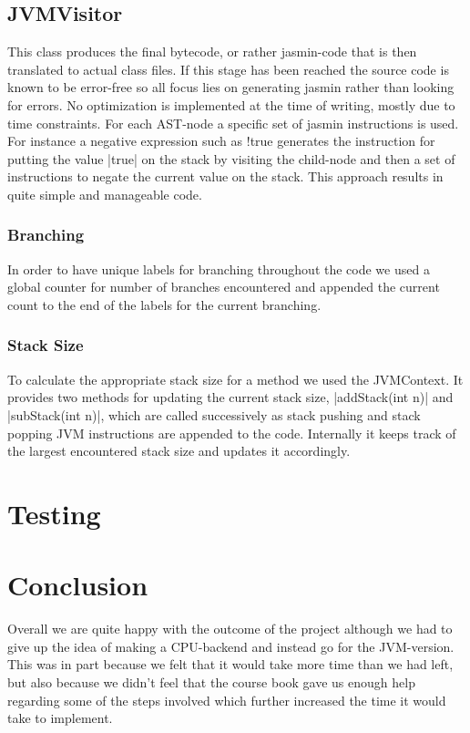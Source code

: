 \documentclass[paper=a4, fontsize=11pt]{scrartcl} %
\numberwithin{equation}{section} %
\numberwithin{figure}{section} %
\numberwithin{table}{section} %
\begin{document}
\subsection{JVMVisitor}

This class produces the final bytecode, or rather jasmin-code that is then translated to actual class files.
If this stage has been reached the source code is known to be error-free so all focus lies on generating jasmin rather than looking for errors.
No optimization is implemented at the time of writing, mostly due to time constraints.
For each AST-node a specific set of jasmin instructions is used.
For instance a negative expression such as !true generates the instruction for putting the value |true| on the stack by visiting the child-node and then a set of instructions to negate the current value on the stack.
This approach results in quite simple and manageable code.

\subsubsection*{Branching}

In order to have unique labels for branching throughout the code we used a global counter for number of branches encountered and appended the current count to the end of the labels for the current branching.

\subsubsection*{Stack Size}

To calculate the appropriate stack size for a method we used the JVMContext.
It provides two methods for updating the current stack size, |addStack(int n)| and |subStack(int n)|, which are called successively as stack pushing and stack popping JVM instructions are appended to the code.
Internally it keeps track of the largest encountered stack size and updates it accordingly.\\

\section{Testing}

\section{Conclusion}

Overall we are quite happy with the outcome of the project although we had to give up the idea of making a CPU-backend and instead go for the JVM-version.
This was in part because we felt that it would take more time than we had left, but also because we didn’t feel that the course book gave us enough help regarding some of the steps involved which further increased the time it would take to implement.
\end{document}
